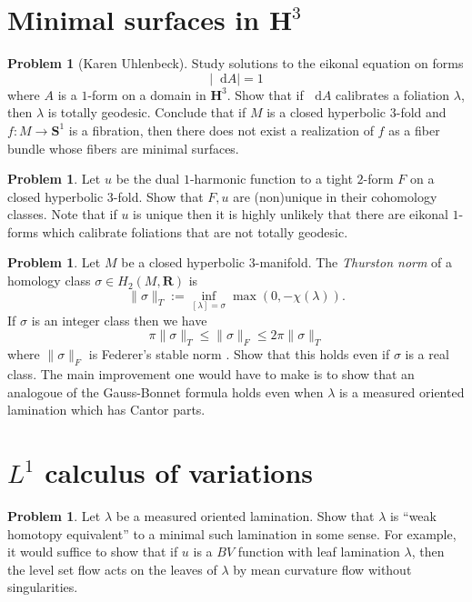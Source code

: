 \documentclass[reqno,11pt]{amsart}
\newcommand{\RR}{\mathbf{R}}
\newcommand{\Hyp}{\mathbf H}
\newcommand{\Sph}{\mathbf S}
\newcommand*\dif{\mathop{}\!\mathrm{d}}
\newcommand{\dfn}[1]{\emph{#1}\index{#1}}
\theoremstyle{definition}
\newtheorem{problem}[theorem]{Problem}
\numberwithin{equation}{section}
\begin{document}
\section{Minimal surfaces in \texorpdfstring{$\Hyp^3$}{hyperbolic 3-space}}
\begin{problem}[Karen Uhlenbeck]
Study solutions to the eikonal equation on forms 
$$|\dif A| = 1$$
where $A$ is a $1$-form on a domain in $\Hyp^3$.
Show that if $\dif A$ calibrates a foliation $\lambda$, then $\lambda$ is totally geodesic.
Conclude that if $M$ is a closed hyperbolic $3$-fold and $f: M \to \Sph^1$ is a fibration, then there does not exist a realization of $f$ as a fiber bundle whose fibers are minimal surfaces.
\end{problem}

\begin{problem}
Let $u$ be the dual $1$-harmonic function to a tight $2$-form $F$ on a closed hyperbolic $3$-fold.
Show that $F, u$ are (non)unique in their cohomology classes.
Note that if $u$ is unique then it is highly unlikely that there are eikonal $1$-forms which calibrate foliations that are not totally geodesic.
\end{problem}

\begin{problem}
Let $M$ be a closed hyperbolic $3$-manifold.
The \dfn{Thurston norm} of a homology class $\sigma \in H_2(M, \RR)$ is 
$$\|\sigma\|_T := \inf_{[\lambda] = \sigma} \max(0, -\chi(\lambda)).$$
If $\sigma$ is an integer class then we have 
$$\pi \|\sigma\|_T \leq \|\sigma\|_F \leq 2\pi \|\sigma\|_T$$
where $\|\sigma\|_F$ is Federer's stable norm \cite[Theorem 3.2]{Brock2017}.
Show that this holds even if $\sigma$ is a real class.
The main improvement one would have to make is to show that an analogoue of the Gauss-Bonnet formula holds even when $\lambda$ is a measured oriented lamination which has Cantor parts.
\end{problem}

\section{\texorpdfstring{$L^1$}{L-1} calculus of variations}
\begin{problem}
Let $\lambda$ be a measured oriented lamination.
Show that $\lambda$ is ``weak homotopy equivalent'' to a minimal such lamination in some sense.
For example, it would suffice to show that if $u$ is a $BV$ function with leaf lamination $\lambda$, then the level set flow acts on the leaves of $\lambda$ by mean curvature flow without singularities.
\end{problem}
\end{document}
